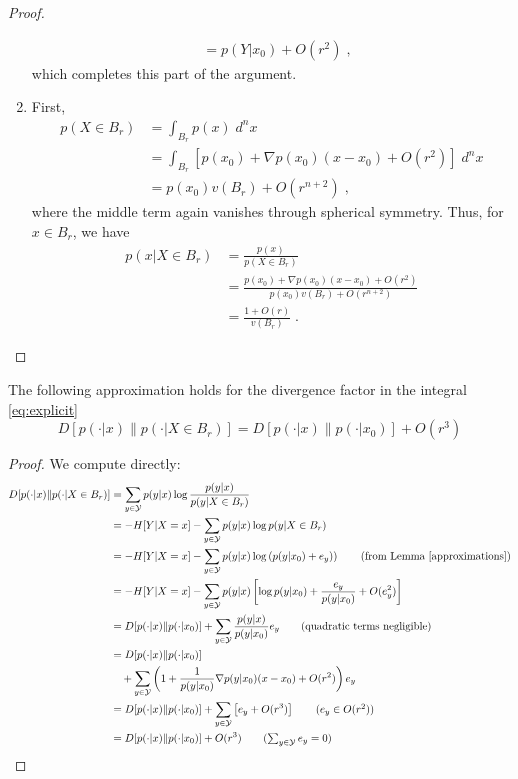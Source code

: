 \begin{proof}
\begin{enumerate}[label=(\alph*)]
\begin{align}
					&= p(Y|x_0) + O(r^2)\;,
				\end{align}
			which completes this part of the argument. 
			\item First, 
				\begin{align}
					p(X \in B_r) &= \int_{B_r} p(x) \; d^nx  \\
					&= \int_{B_r} \left[p(x_0) + \nabla p(x_0)(x - x_0) + O(r^2)\right] \; d^nx \\ 
					&= p(x_0) v(B_r) + O(r^{n+2})\;,
				\end{align}
				where the middle term again vanishes through spherical symmetry. Thus, for $x \in B_r$, we have
				\begin{align}
					p(x | X \in B_r) &= \frac{p(x)}{p(X \in B_r)} \\
					&= \frac{p(x_0) + \nabla p(x_0)(x - x_0) + O(r^2)}{p(x_0) v(B_r) + O(r^{n+2})} \\
					&= \frac{1 + O(r)}{v(B_r)}\;.
				\end{align}
		\end{enumerate}
	\end{proof}

	\begin{lm} The following approximation holds for the divergence factor in the integral \eqref{eq:explicit}
		\begin{equation}
			D[p(\cdot|x)\| p(\cdot|X \in B_r)] = D[p(\cdot|x)\| p(\cdot|x_0)] + O(r^{3})
		\end{equation}
	\end{lm}
	\begin{proof}
		We compute directly: 
		\begin{align}
			D[p(\cdot|x)\| p(\cdot|X \in B_r)] &= \sum_{y \in \mathcal{Y}} p(y|x) \log \frac{p(y|x)}{p(y|X \in B_r)} \\
			&= - H[Y|X = x] - \sum_{y \in \mathcal{Y}} p(y|x) \log p(y|X \in B_r) \\
			&= - H[Y|X = x] - \sum_{y \in \mathcal{Y}} p(y|x) \log \left(p(y|x_0) + e_y)\right) \tag{from Lemma \ref{approximations}}\\
			&= - H[Y|X = x] - \sum_{y \in \mathcal{Y}} p(y|x) \left[\log p(y|x_0) + \frac{e_y}{p(y|x_0)} + O(e_y^2)\right] \\
			&= D[p(\cdot|x)\| p(\cdot|x_0)] + \sum_{y \in \mathcal{Y}} \frac{p(y|x)}{p(y|x_0)}  e_y \tag{quadratic terms negligible} \\
			&=D[p(\cdot|x)\| p(\cdot|x_0)] \\
			&\quad + \sum_{y \in \mathcal{Y}} \left(1 + \frac{1}{p(y|x_0)} \nabla p(y|x_0)(x - x_0) + O(r^{2})\right)    e_y \\
			&= D[p(\cdot|x)\| p(\cdot|x_0)] + \sum_{y \in \mathcal{Y}} \left[e_y + O(r^{3})\right] \tag{$e_y \in O(r^2)$}\\
			&= D[p(\cdot|x)\| p(\cdot|x_0)] + O(r^3) \tag{$\sum_{y \in \mathcal{Y}} e_y = 0$}
		\end{align}
	\end{proof}


